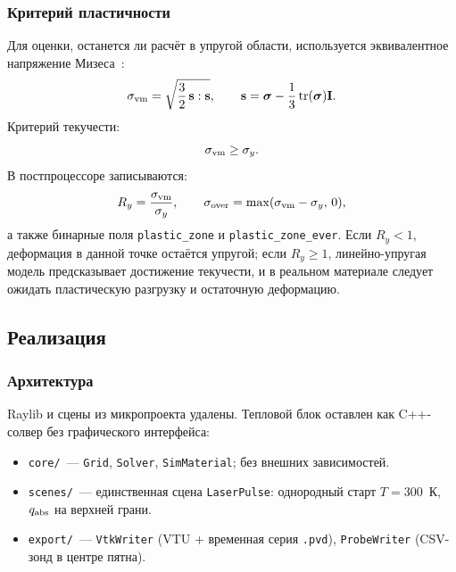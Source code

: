 \subsubsection{Критерий пластичности}

Для оценки, останется ли расчёт в упругой области, используется
эквивалентное напряжение Мизеса~\cite{mises1913}:
\begin{equation}
  \sigma_{\rm vm}
  = \sqrt{\frac{3}{2}\,\mathbf{s}:\mathbf{s}}, \qquad
  \mathbf{s}
  = \boldsymbol{\sigma}
  - \frac{1}{3}\operatorname{tr}(\boldsymbol{\sigma})\mathbf{I}.
\end{equation}
Критерий текучести:
\begin{equation}
  \sigma_{\rm vm} \ge \sigma_y.
\end{equation}
В постпроцессоре записываются:
\begin{equation}
  R_y = \frac{\sigma_{\rm vm}}{\sigma_y}, \qquad
  \sigma_{\rm over}
  = \max(\sigma_{\rm vm}-\sigma_y,\,0),
\end{equation}
а также бинарные поля \texttt{plastic\_zone} и
\texttt{plastic\_zone\_ever}. Если $R_y < 1$, деформация в данной
точке остаётся упругой; если $R_y \ge 1$, линейно-упругая модель
предсказывает достижение текучести, и в реальном материале следует
ожидать пластическую разгрузку и остаточную деформацию. 

\subsection{Реализация}

\subsubsection{Архитектура}

Raylib и сцены из микропроекта удалены. Тепловой блок оставлен как
C++-солвер без графического интерфейса:
\begin{itemize}
  \item \texttt{core/}~--- \texttt{Grid}, \texttt{Solver},
        \texttt{SimMaterial}; без внешних зависимостей.
  \item \texttt{scenes/}~--- единственная сцена \texttt{LaserPulse}:
        однородный старт $T = 300$~К, $q_{\rm abs}$ на верхней грани.
  \item \texttt{export/}~--- \texttt{VtkWriter} (VTU + временная серия
        \texttt{.pvd}), \texttt{ProbeWriter} (CSV-зонд в центре пятна).
\end{itemize}

